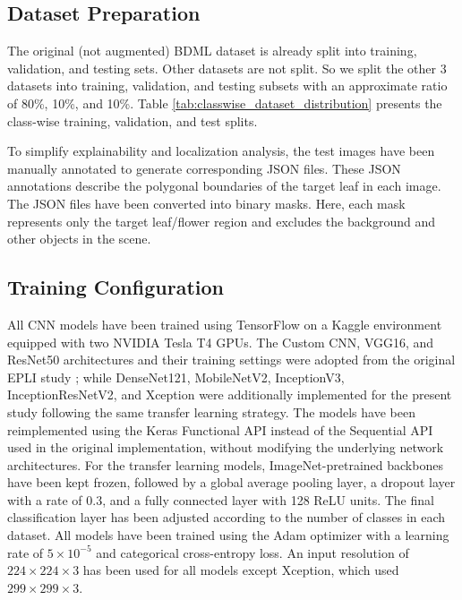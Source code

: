 \documentclass[a4paper,fleqn]{cas-dc}
\begin{document}
\subsection{Dataset Preparation}
The original (not augmented) BDML dataset is already split into training, validation, and testing sets. Other datasets are not split. So we split the other 3 datasets into training, validation, and testing subsets with an approximate ratio of 80\%, 10\%, and 10\%. Table \ref{tab:classwise_dataset_distribution} presents the class-wise training, validation, and test splits.

To simplify explainability and localization analysis, the test images have been manually annotated to generate corresponding JSON files. These JSON annotations describe the polygonal boundaries of the target leaf in each image. The JSON files have been converted into binary masks. Here, each mask represents only the target leaf/flower region and excludes the background and other objects in the scene.




\subsection{Training Configuration}

All CNN models have been trained using TensorFlow on a Kaggle environment equipped with two NVIDIA Tesla T4 GPUs. The Custom CNN, VGG16, and ResNet50 architectures and their training settings were adopted from the original EPLI study \cite{r10}; while DenseNet121, MobileNetV2, InceptionV3, InceptionResNetV2, and Xception were additionally implemented for the present study following the same transfer learning strategy. The models have been reimplemented using the Keras Functional API instead of the Sequential API used in the original implementation, without modifying the underlying network architectures. For the transfer learning models, ImageNet-pretrained backbones have been kept frozen, followed by a global average pooling layer, a dropout layer with a rate of 0.3, and a fully connected layer with 128 ReLU units. The final classification layer has been adjusted according to the number of classes in each dataset. All models have been trained using the Adam optimizer with a learning rate of $5\times10^{-5}$ and categorical cross-entropy loss. An input resolution of $224\times224\times3$ has been used for all models except Xception, which used $299\times299\times3$.
\end{document}

